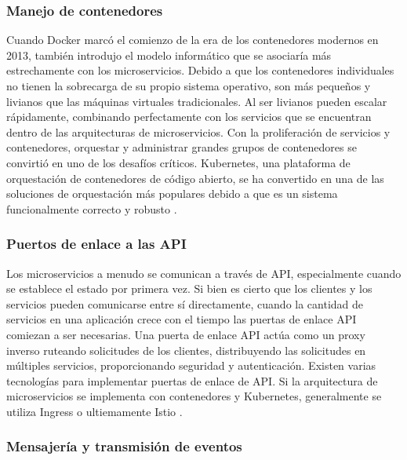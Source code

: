 \subsubsection{Manejo de contenedores}

    Cuando Docker marcó el comienzo de la era de los contenedores modernos en 2013, también introdujo el modelo informático que se asociaría más estrechamente con los microservicios. Debido a que los contenedores individuales no tienen la sobrecarga de su propio sistema operativo, son más pequeños y livianos que las máquinas virtuales tradicionales. Al ser livianos pueden escalar rápidamente, combinando perfectamente con los servicios que se encuentran dentro de las arquitecturas de microservicios.
    Con la proliferación de servicios y contenedores, orquestar y administrar grandes grupos de contenedores se convirtió en uno de los desafíos críticos. Kubernetes, una plataforma de orquestación de contenedores de código abierto, se ha convertido en una de las soluciones de orquestación más populares debido a que es un sistema funcionalmente correcto y robusto \cite{ibmmicroservicios}.


\subsubsection{Puertos de enlace a las API}

    Los microservicios a menudo se comunican a través de API, especialmente cuando se establece el estado por primera vez. Si bien es cierto que los clientes y los servicios pueden comunicarse entre sí directamente, cuando la cantidad de servicios en una aplicación crece con el tiempo las puertas de enlace API comiezan a ser necesarias. Una puerta de enlace API actúa como un proxy inverso ruteando solicitudes de los clientes, distribuyendo las solicitudes en múltiples servicios, proporcionando seguridad y autenticación.
    Existen varias tecnologías para implementar puertas de enlace de API. Si la arquitectura de microservicios se implementa con contenedores y Kubernetes, generalmente se utiliza Ingress o ultiemamente Istio 
    \cite{ibmmicroservicios}.


\subsubsection{Mensajería y transmisión de eventos}

